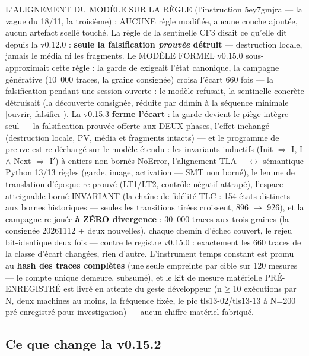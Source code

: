 L'ALIGNEMENT DU MODÈLE SUR LA RÈGLE (l'instruction 5ey7gmjra — la vague
du 18/11, la troisième) : AUCUNE règle modifiée, aucune couche ajoutée,
aucun artefact scellé touché. La règle de la sentinelle CF3 disait ce
qu'elle dit depuis la v0.12.0 : \textbf{seule la falsification
\emph{prouvée} détruit} — destruction locale, jamais le média ni les
fragments. Le MODÈLE FORMEL v0.15.0 sous-approximait cette règle : la
garde de  exigeait l'état canonique, la
campagne générative (10~000 traces, la graine consignée) croisa l'écart
660 fois — la falsification pendant une session ouverte : le modèle
refusait, la sentinelle concrète détruisait (la découverte consignée,
réduite par ddmin à la séquence minimale [ouvrir, falsifier]). La
v0.15.3 \textbf{ferme l'écart} : la garde devient le piège intègre
seul — la falsification prouvée offerte aux DEUX phases, l'effet
inchangé (destruction locale, PV, média et fragments intacts) — et le
programme de preuve est re-déchargé sur le modèle étendu : les
invariants inductifs (Init $\Rightarrow$ I, I $\wedge$ Next
$\Rightarrow$ I$'$) à entiers non bornés NoError, l'alignement
TLA+~$\leftrightarrow$ sémantique Python 13/13 règles (garde, image,
activation — SMT non borné), le lemme de translation d'époque re-prouvé
(LT1/LT2, contrôle négatif attrapé), l'espace atteignable borné
INVARIANT (la chaîne de fidélité TLC : 154 états distincts aux bornes
historiques — seules les transitions tirées croissent, 896 $\to$ 926),
et la campagne re-jouée \textbf{à ZÉRO divergence} : 30~000 traces aux
trois graines (la consignée 20261112 + deux nouvelles), chaque chemin
d'échec couvert, le rejeu bit-identique deux fois — contre le registre
v0.15.0 : exactement les 660 traces de la classe d'écart changées, rien
d'autre. L'instrument temps constant est promu au \textbf{hash des
traces complètes} (une seule empreinte par cible sur 120 mesures — le
compte unique demeure, subsumé), et le kit de mesure matérielle
PRÉ-ENREGISTRÉ est livré en attente du geste développeur (n$\ge$10
exécutions par N, deux machines au moins, la fréquence fixée, le pic
tls13-02/tls13-13 à N=200 pré-enregistré pour investigation) — aucun
chiffre matériel fabriqué.

\subsection{Ce que change la v0.15.2}\label{sec:nouveautes152}

